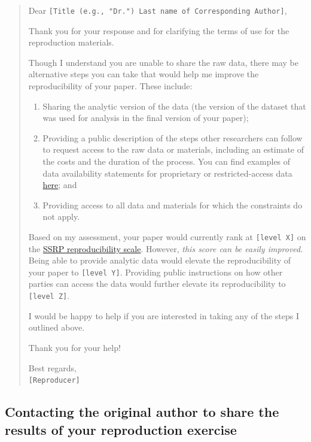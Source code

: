 \documentclass[
]{book}
\providecommand{\tightlist}{%
  \setlength{\itemsep}{0pt}\setlength{\parskip}{0pt}}
\begin{document}
\begin{quote}
Dear \texttt{{[}Title\ (e.g.,\ "Dr.")\ Last\ name\ of\ Corresponding\ Author{]}},

Thank you for your response and for clarifying the terms of use for the reproduction materials.

Though I understand you are unable to share the raw data, there may be alternative steps you can take that would help me improve the reproducibility of your paper. These include:

\begin{enumerate}
\def\labelenumi{\arabic{enumi}.}
\tightlist
\item
  Sharing the analytic version of the data (the version of the dataset that was used for analysis in the final version of your paper);\\
\item
  Providing a public description of the steps other researchers can follow to request access to the raw data or materials, including an estimate of the costs and the duration of the process. You can find examples of data availability statements for proprietary or restricted-access data \href{https://social-science-data-editors.github.io/guidance/Requested_information_dcas.html}{here}; and\\
\item
  Providing access to all data and materials for which the constraints do not apply.
\end{enumerate}

Based on my assessment, your paper would currently rank at \texttt{{[}level\ X{]}} on the \href{https://bitss.github.io/ACRE/assessment.html\#levels-of-computational-reproducibility-for-a-specific-output}{SSRP reproducibility scale}. However, \emph{this score can be easily improved}. Being able to provide analytic data would elevate the reproducibility of your paper to \texttt{{[}level\ Y{]}}. Providing public instructions on how other parties can access the data would further elevate its reproducibility to \texttt{{[}level\ Z{]}}.

I would be happy to help if you are interested in taking any of the steps I outlined above.

Thank you for your help!

Best regards,\\
\texttt{{[}Reproducer{]}}
\end{quote}

\hypertarget{contacting-the-original-author-to-share-the-results-of-your-reproduction-exercise}{%
\subsection{Contacting the original author to share the results of your reproduction exercise}\label{contacting-the-original-author-to-share-the-results-of-your-reproduction-exercise}}
\end{document}
